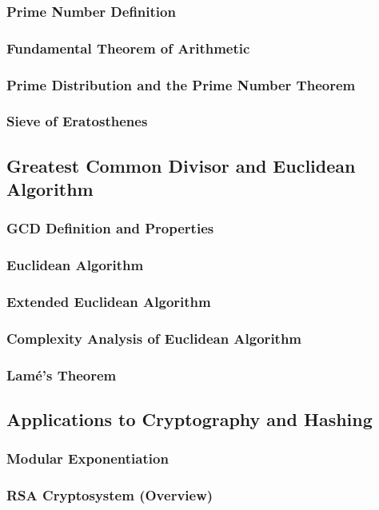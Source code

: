 \subsubsection{Prime Number Definition}
\subsubsection{Fundamental Theorem of Arithmetic}
\subsubsection{Prime Distribution and the Prime Number Theorem}
\subsubsection{Sieve of Eratosthenes}

\subsection{Greatest Common Divisor and Euclidean Algorithm}
\subsubsection{GCD Definition and Properties}
\subsubsection{Euclidean Algorithm}
\subsubsection{Extended Euclidean Algorithm}
\subsubsection{Complexity Analysis of Euclidean Algorithm}
\subsubsection{Lamé's Theorem}

\subsection{Applications to Cryptography and Hashing}
\subsubsection{Modular Exponentiation}
\subsubsection{RSA Cryptosystem (Overview)}
